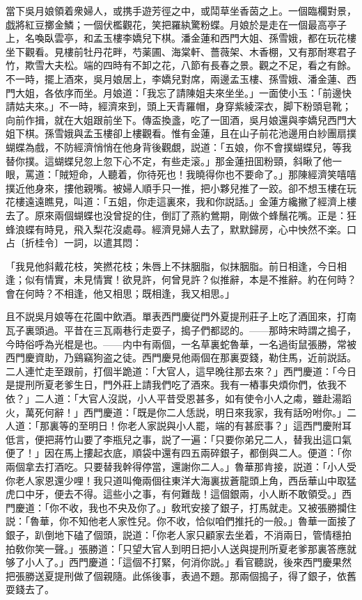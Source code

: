 當下吳月娘領着衆婦人，或携手遊芳徑之中，或鬦草坐香茵之上。一個臨欄對景，戯將紅豆擲金鱗；一個伏檻觀花，笑把羅紈驚粉蝶。月娘於是走在一個最高亭子上，名喚臥雲亭，和孟玉樓李嬌兒下棋。潘金蓮和西門大姐、孫雪娥，都在玩花樓坐下觀看。見樓前牡丹花畔，芍薬圃、海棠軒、薔薇架、木香棚，又有那耐寒君子竹，欺雪大夫松。端的四時有不卸之花，八節有長春之景。觀之不足，看之有餘。不一時，擺上酒來，吳月娘居上，李嬌兒對席，兩邊孟玉樓、孫雪娥、潘金蓮、西門大姐，各依序而坐。月娘道：「我忘了請陳姐夫來坐坐。」一面使小玉：「前邊快請姑夫來。」不一時，經濟來到，頭上天青羅帽，身穿紫綾深衣，脚下粉頭皂靴；向前作揖，就在大姐跟前坐下。傳盃換盞，吃了一囬酒，吳月娘還與李嬌兒西門大姐下棋。孫雪娥與孟玉樓卻上樓觀看。惟有金蓮，且在山子前花池邊用白紗團扇撲蝴蝶為戲，不防經濟悄悄在他身背後觀覷，説道：「五娘，你不會撲蝴蝶兒，等我替你撲。這蝴蝶兒忽上忽下心不定，有些走滚。」那金蓮扭囬粉頸，斜瞅了他一眼，罵道：「賊短命，人聽着，你待死也！我曉得你也不要命了。」那陳經濟笑嘻嘻撲近他身來，摟他親嘴。被婦人順手只一推，把小夥兒推了一跤。卻不想玉樓在玩花樓遠遠瞧見，叫道：「五姐，你走這裏來，我和你説話。」金蓮方纔撇了經濟上樓去了。原來兩個蝴蝶也没曾捉的住，倒訂了燕約鶯期，剛做个蜂鬚花嘴。正是：狂蜂浪蝶有時見，飛入梨花沒處尋。經濟見婦人去了，默默歸房，心中怏然不楽。口占〔折桂令〕一詞，以遣其悶：

\begin{myquote}
「我見他斜戴花枝，笑撚花枝；朱唇上不抹胭脂，似抹胭脂。前日相逢，今日相逢；似有情實，未見情實！欲見許，何曾見許？似推辭，本是不推辭。約在何時？會在何時？不相逢，他又相思；既相逢，我又相思。」
\end{myquote}

且不説吳月娘等在花園中飲酒。單表西門慶従門外夏提刑莊子上吃了酒囬來，打南瓦子裏頭過。平昔在三瓦兩巷行走耍子，搗子們都認的。——那時宋時謂之搗子，今時俗呼為光棍是也。——内中有兩個，一名草裏蛇魯華，一名過街鼠張勝，常被西門慶資助，乃鷄竊狗盗之徒。西門慶見他兩個在那裏耍錢，勒住馬，近前説話。二人連忙走至跟前，打個半跪道：「大官人，這早晚往那去來？」西門慶道：「今日是提刑所夏老爹生日，門外莊上請我們吃了酒來。我有一樁事央煩你們，依我不依？」二人道：「大官人沒説，小人平昔受恩甚多，如有使令小人之䖏，雖赴湯蹈火，萬死何辭！」西門慶道：「既是你二人恁説，明日來我家，我有話吩咐你。」二人道：「那裏等的至明日！你老人家説與小人罷，端的有甚麽事？」這西門慶附耳低言，便把蔣竹山要了李瓶兒之事，説了一遍：「只要你弟兄二人，替我出這口氣便了！」因在馬上摟起衣底，順袋中還有四五兩碎銀子，都倒與二人。便道：「你兩個拿去打酒吃。只要替我幹得停當，還謝你二人。」魯華那肯接，説道：「小人受你老人家恩還少哩！我只道叫俺兩個往東洋大海裏拔蒼龍頭上角，西岳華山中取猛虎口中牙，便去不得。這些小之事，有何難哉！這個銀兩，小人断不敢領受。」西門慶道：「你不收，我也不央及你了。」敎玳安接了銀子，打馬就走。又被張勝攔住説：「魯華，你不知他老人家性兒。你不收，恰似咱們推托的一般。」魯華一面接了銀子，趴倒地下磕了個頭，説道：「你老人家只顧家去坐着，不消兩日，管情穩拍拍敎你笑一聲。」張勝道：「只望大官人到明日把小人送與提刑所夏老爹那裏答應就够了小人了。」西門慶道：「這個不打緊，何消你説。」看官聽説，後來西門慶果然把張勝送夏提刑做了個親隨。此係後事，表過不題。那兩個搗子，得了銀子，依舊耍錢去了。

